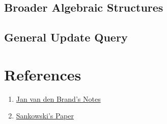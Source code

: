 \documentclass[12pt]{article}
\begin{document}
\subsection{Broader Algebraic Structures}
\subsection{General Update Query}

\section*{References}

\begin{enumerate}
    \item \href{https://www.dropbox.com/scl/fi/zjfbk8dbxbzcn05dr8l11/fall22_daa_lecturenotes.pdf?rlkey=g6z7z1hvj7jknvlpy1s3dqcjw&e=1&st=13r18doq&dl=0}{Jan van den Brand's Notes}
    \item \href{https://www.dropbox.com/scl/fi/5w4k0lg0u8e36zugapp6c/Sankowski-COCOON-05-subquadratic-dynamic-distances.pdf?rlkey=5eahwsl7a49kwxyvlr7yqyoz3&e=2&st=d3zo7owc&dl=0}{Sankowski's Paper}
\end{enumerate}
\end{document}
